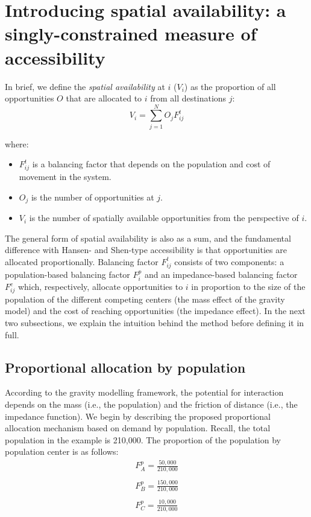 \documentclass[]{elsarticle} %
\providecommand{\tightlist}{%
  \setlength{\itemsep}{0pt}\setlength{\parskip}{0pt}}
\begin{document}
\hypertarget{introducing-spatial-availability-a-singly-constrained-measure-of-accessibility}{%
\section{Introducing spatial availability: a singly-constrained measure
of
accessibility}\label{introducing-spatial-availability-a-singly-constrained-measure-of-accessibility}}

In brief, we define the \emph{spatial availability} at \(i\) (\(V_{i}\))
as the proportion of all opportunities \(O\) that are allocated to \(i\)
from all destinations \(j\): \[
V_i = \sum_{j=1}^NO_jF^t_{ij}
\]

\noindent where:

\begin{itemize}
\tightlist
\item
  \(F^t_{ij}\) is a balancing factor that depends on the population and
  cost of movement in the system.
\item
  \(O_j\) is the number of opportunities at \(j\).
\item
  \(V_i\) is the number of spatially available opportunities from the
  perspective of \(i\).
\end{itemize}

The general form of spatial availability is also as a sum, and the
fundamental difference with Hansen- and Shen-type accessibility is that
opportunities are allocated proportionally. Balancing factor
\(F^t_{ij}\) consists of two components: a population-based balancing
factor \(F^p_{i}\) and an impedance-based balancing factor \(F^c_{ij}\)
which, respectively, allocate opportunities to \(i\) in proportion to
the size of the population of the different competing centers (the mass
effect of the gravity model) and the cost of reaching opportunities (the
impedance effect). In the next two subsections, we explain the intuition
behind the method before defining it in full.

\hypertarget{proportional-allocation-by-population}{%
\subsection{Proportional allocation by
population}\label{proportional-allocation-by-population}}

According to the gravity modelling framework, the potential for
interaction depends on the mass (i.e., the population) and the friction
of distance (i.e., the impedance function). We begin by describing the
proposed proportional allocation mechanism based on demand by
population. Recall, the total population in the example is 210,000. The
proportion of the population by population center is as follows: \[
\begin{array}{l}
F^p_A = \frac{50,000}{210,000}\\
\\
F^p_B = \frac{150,000}{210,000}\\
\\
F^p_C = \frac{10,000}{210,000}\\
\end{array}
\]
\end{document}

